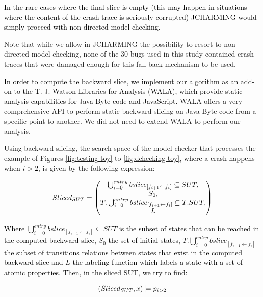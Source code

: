 \documentclass[times, doublespace]{smrauth}
\newcommand{\red}[1]{\textcolor{black}{#1}}
\begin{document}
{\red{In the rare cases where the final slice is empty (this
may happen in situations where the content of the crash trace
is seriously corrupted) JCHARMING would simply
proceed with non-directed model checking.}




Note that while we allow in JCHARMING the possibility to resort to non-directed
model
checking, none of the 30 bugs used in this study contained crash traces
that were damaged enough for this fall back mechanism to be used.

\red{In order to compute the backward slice, we implement our
algorithm as an add-on to the T. J. Watson
Libraries for Analysis (WALA)\cite{IBM2006}, which provide static
analysis capabilities for Java Byte code and JavaScript.}  WALA offers a very comprehensive API
to perform static backward slicing on Java Byte code from a
specific point to another.
We did not need to extend WALA to perform our
analysis.



Using backward slicing, the search space of the model checker
that processes the example of Figures \ref{fig:testing-toy} to \ref{fig:dchecking-toy}, \red{where a crash happens when $i>2$}, is given by the following expression:

\begin{equation}
  \red{
  Sliced_{SUT} =
  \begin{pmatrix}
    \bigcup_{i=0}^{entry} bslice_{[f_{i+1} \leftarrow f_i]} \subseteq SUT, \\
    S_0, \\
    T.\bigcup_{i=0}^{entry} bslice_{[f_{i+1} \leftarrow f_i]}  \subseteq T.SUT, \\
    L
  \end{pmatrix}
  }
\end{equation}

\red{\noindent Where $\bigcup_{i=0}^{entry} bslice_{[f_{i+1} \leftarrow f_i]} \subseteq SUT$ is the subset of states that can be reached in the computed backward slice, $S_0$ the set of initial states, $T.\bigcup_{i=0}^{entry} bslice_{[f_{i+1} \leftarrow f_i]}$ the subset of transitions relations between states that exist in the computed backward slice and $L$ the labeling function which labels a state with a set of atomic properties.
Then, in the sliced SUT, we try to find:}

\begin{equation}
  \red{
    (Sliced_{SUT}, x) \models p_{i>2}
  }
\end{equation}

}
\end{document}

